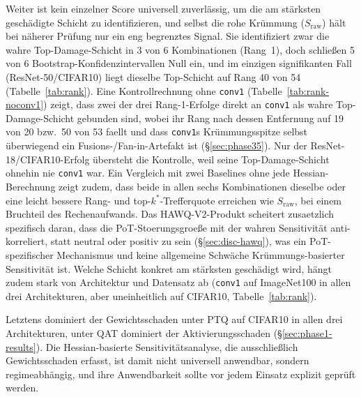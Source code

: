 Weiter ist kein einzelner Score universell zuverlässig, um die am stärksten geschädigte Schicht zu identifizieren, und selbst die rohe Krümmung ($S_{\mathrm{raw}}$) hält bei näherer Prüfung nur ein eng begrenztes Signal. Sie identifiziert zwar die wahre Top-Damage-Schicht in 3 von 6 Kombinationen (Rang~1), doch schließen 5 von 6 Bootstrap-Konfidenzintervallen Null ein, und im einzigen signifikanten Fall (ResNet-50/CIFAR10) liegt dieselbe Top-Schicht auf Rang 40 von 54 (Tabelle~\ref{tab:rank}). Eine Kontrollrechnung ohne \texttt{conv1} (Tabelle~\ref{tab:rank-noconv1}) zeigt, dass zwei der drei Rang-1-Erfolge direkt an \texttt{conv1} als wahre Top-Damage-Schicht gebunden sind, wobei ihr Rang nach dessen Entfernung auf 19 von 20 bzw.\ 50 von 53 faellt und dass \texttt{conv1}s Krümmungsspitze selbst überwiegend ein Fusions-/Fan-in-Artefakt ist (\S\ref{sec:phase35}). Nur der ResNet-18/CIFAR10-Erfolg übersteht die Kontrolle, weil seine Top-Damage-Schicht ohnehin nie \texttt{conv1} war. Ein Vergleich mit zwei Baselines ohne jede Hessian-Berechnung zeigt zudem, dass beide in allen sechs Kombinationen dieselbe oder eine leicht bessere Rang- und top-$k^*$-Trefferquote erreichen wie $S_{\mathrm{raw}}$, bei einem Bruchteil des Rechenaufwands. Das HAWQ-V2-Produkt scheitert zusaetzlich spezifisch daran, dass die PoT-Stoerungsgroeße mit der wahren Sensitivität anti-korreliert, statt neutral oder positiv zu sein (\S\ref{sec:disc-hawq}), was ein PoT-spezifischer Mechanismus und keine allgemeine Schwäche Krümmungs-basierter Sensitivität ist. Welche Schicht konkret am stärksten geschädigt wird, hängt zudem stark von Architektur und Datensatz ab (\texttt{conv1} auf ImageNet100 in allen drei Architekturen, aber uneinheitlich auf CIFAR10, Tabelle~\ref{tab:rank}).
\par\medskip

Letztens dominiert der Gewichtsschaden unter PTQ auf CIFAR10 in allen drei Architekturen, unter QAT dominiert der Aktivierungsschaden (\S\ref{sec:phase1-results}). Die Hessian-basierte Sensitivitätsanalyse, die ausschließlich Gewichtsschaden erfasst, ist damit nicht universell anwendbar, sondern regimeabhängig, und ihre Anwendbarkeit sollte vor jedem Einsatz explizit geprüft werden.
\par\medskip